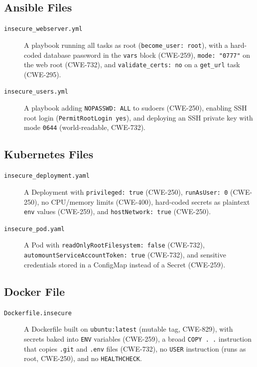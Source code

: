 \documentclass[12pt, a4paper]{report}
\begin{document}
\subsection{Ansible Files}

\begin{description}
  \item[\texttt{insecure\_webserver.yml}]\hfill\break
  A playbook running all tasks as root (\texttt{become\_user: root}), with a hard-coded database password in the
  \texttt{vars} block (CWE-259), \texttt{mode: "0777"} on the web root (CWE-732),
  and \texttt{validate\_certs: no} on a \texttt{get\_url} task (CWE-295).

  \item[\texttt{insecure\_users.yml}] A playbook adding \texttt{NOPASSWD: ALL} to
  sudoers (CWE-250), enabling SSH root login (\texttt{PermitRootLogin yes}), and
  deploying an SSH private key with mode \texttt{0644} (world-readable, CWE-732).
\end{description}

\subsection{Kubernetes Files}

\begin{description}
  \item[\texttt{insecure\_deployment.yaml}] A Deployment with
  \texttt{privileged: true} (CWE-250), \texttt{runAsUser: 0} (CWE-250), no CPU/memory
  limits (CWE-400), hard-coded secrets as plaintext \texttt{env} values (CWE-259),
  and \texttt{hostNetwork: true} (CWE-250).

  \item[\texttt{insecure\_pod.yaml}]\hfill\break
  A Pod with \texttt{readOnlyRootFilesystem: false} (CWE-732),\linebreak
  \texttt{automountServiceAccountToken: true} (CWE-732),
  and sensitive credentials stored in a ConfigMap instead of a Secret (CWE-259).
\end{description}

\subsection{Docker File}

\begin{description}
  \item[\texttt{Dockerfile.insecure}] A Dockerfile built on \texttt{ubuntu:latest}
  (mutable tag, CWE-829), with secrets baked into \texttt{ENV} variables (CWE-259),
  a broad \texttt{COPY . .} instruction that copies \texttt{.git} and \texttt{.env}
  files (CWE-732), no \texttt{USER} instruction (runs as root, CWE-250), and no
  \texttt{HEALTHCHECK}.
\end{description}
\end{document}
